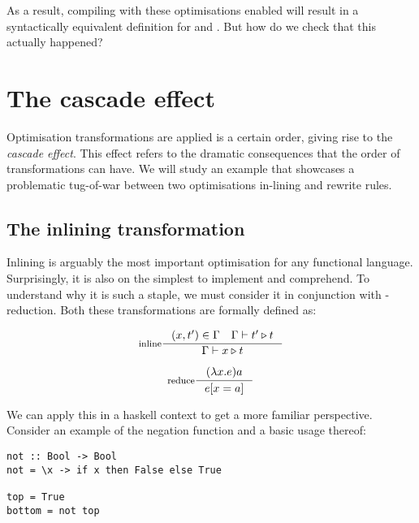 As a result, compiling with these optimisations enabled will result in a syntactically equivalent
definition for  and . But how do we check that this actually happened?

\section{The cascade effect}

Optimisation transformations are applied is a certain order, giving rise to the \textit{cascade effect}. \cite{haskell_optimisations_1997}
This effect refers to the dramatic consequences that the order of transformations can have. We will study an example that
showcases a problematic tug-of-war between two optimisations in-lining and rewrite rules.

\subsection{The inlining transformation}

Inlining is arguably the most important optimisation for any functional language. Surprisingly, it is also on the simplest to implement and comprehend. To understand
why it is such a staple, we must consider it in conjunction with \textbeta-reduction. Both these
transformations are formally defined as:

\begin{multicols}{2}
  \begin{equation}
    \inference[inline]{(x,t') \in \Gamma \quad \Gamma \vdash t' \triangleright t}{\Gamma \vdash x \triangleright t}
  \end{equation}
  \break

  \begin{equation}
  \inference[reduce]{(\lambda x. e) a}{e[x = a]}
  \end{equation}
\end{multicols}

We can apply this in a haskell context to get a more familiar perspective. 
Consider an example of the negation function  and a basic usage thereof:

\begin{listing}[H]
\begin{verbatim}
not :: Bool -> Bool
not = \x -> if x then False else True

top = True
bottom = not top
\end{verbatim}
\end{listing}

